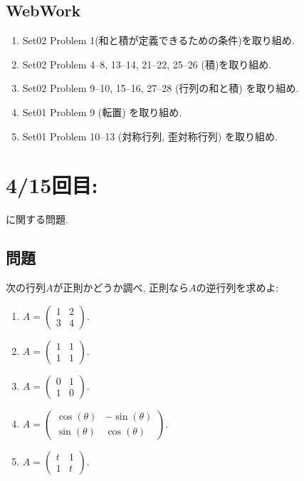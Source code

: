 \subsection{WebWork}
\begin{enumerate}
\item Set02 Problem 1(和と積が定義できるための条件)を取り組め.
\item Set02 Problem 4--8, 13--14, 21--22, 25--26 (積)を取り組め.
\item Set02 Problem 9--10, 15--16, 27--28 (行列の和と積) を取り組め.
\item Set01 Problem 9 (転置) を取り組め.
\item Set01 Problem 10--13 (対称行列, 歪対称行列) を取り組め.
\end{enumerate}

\newpage
\section{4/15回目: }
に関する問題.
\subsection{問題}
\begin{quiz}
  次の行列$A$が正則かどうか調べ, 正則なら$A$の逆行列を求めよ:
  \begin{enumerate}
    \item $A=\begin{pmatrix}1&2\\3&4\end{pmatrix}$.
    \item $A=\begin{pmatrix}1&1\\1&1\end{pmatrix}$.
    \item $A=\begin{pmatrix}0&1\\1&0\end{pmatrix}$.
    \item $A=\begin{pmatrix}\cos(\theta)&-\sin(\theta)\\\sin(\theta)&\cos(\theta)\end{pmatrix}$.
    \item $A=\begin{pmatrix}t&1\\1&t\end{pmatrix}$.
  \end{enumerate}
\end{quiz}

